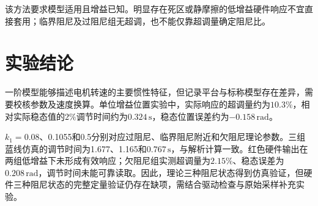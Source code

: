 \documentclass[12pt]{article}
\newcommand{\unit}[1]{\,\mathrm{#1}}
\begin{document}
该方法要求模型适用且增益已知。明显存在死区或静摩擦的低增益硬件响应不宜直接套用；临界阻尼及过阻尼组无超调，也不能仅靠超调量确定阻尼比。

\section{实验结论}
一阶模型能够描述电机转速的主要惯性特征，但记录平台与标称模型存在差异，需要校核参数及速度换算。单位增益位置实验中，实际响应的超调量约为$10.3\%$，相对实际稳态值的$2\%$调节时间约为$0.324\unit{s}$，稳态位置误差约为$-0.158\unit{rad}$。

$k_1=0.08$、0.1055和0.5分别对应过阻尼、临界阻尼附近和欠阻尼理论参数。三组蓝线仿真的调节时间为1.677、1.165和$0.767\unit{s}$，与解析计算一致。红色硬件输出在两组低增益下未形成有效响应；欠阻尼组实测超调量为$2.15\%$、稳态误差为$0.208\unit{rad}$，调节时间未能可靠读取。因此，理论三种阻尼状态得到仿真验证，但硬件三种阻尼状态的完整定量验证仍存在缺项，需结合驱动检查与原始采样补充实验。
\end{document}
